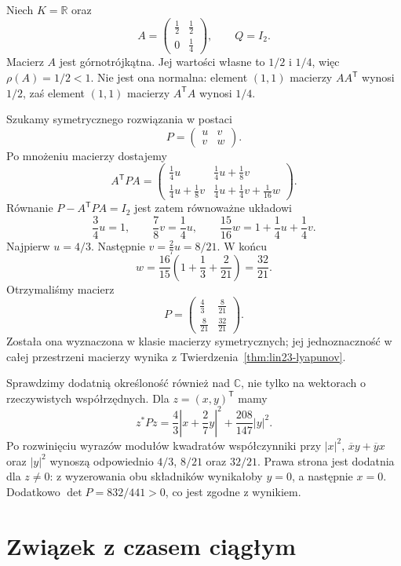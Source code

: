 \begin{przyklad}
\label{prz:lin23-nonnormal}
Niech \(K=\mathbb R\)
oraz
\[
 A=\begin{pmatrix}
 \frac12&\frac12\\
 0&\frac14
 \end{pmatrix},\qquad Q=I_2.
\]
Macierz \(A\) jest górnotrójkątna.
Jej wartości własne to
\(1/2\) i \(1/4\),
więc \(\rho(A)=1/2<1\).
Nie jest ona normalna:
element \((1,1)\) macierzy
\(AA^{\mathsf T}\)
wynosi \(1/2\), zaś
element \((1,1)\)
macierzy \(A^{\mathsf T}A\)
wynosi \(1/4\).

Szukamy symetrycznego
rozwiązania w postaci
\[
 P=\begin{pmatrix}u&v\\v&w\end{pmatrix}.
\]
Po mnożeniu macierzy dostajemy
\[
 A^{\mathsf T}PA
 =\begin{pmatrix}
 \frac14u&
 \frac14u+\frac18v\\
 \frac14u+\frac18v&
 \frac14u+\frac14v+\frac1{16}w
 \end{pmatrix}.
\]
Równanie \(P-A^{\mathsf T}PA=I_2\)
jest zatem równoważne układowi
\[
 \frac34u=1,\qquad
 \frac78v=\frac14u,\qquad
 \frac{15}{16}w
 =1+\frac14u+\frac14v.
\]
Najpierw \(u=4/3\).
Następnie
\(v=\frac27u=8/21\).
W końcu
\[
 w=\frac{16}{15}
       \left(1+\frac13+\frac2{21}\right)
   =\frac{32}{21}.
\]
Otrzymaliśmy macierz
\[
 P=\begin{pmatrix}
 \frac43&\frac8{21}\\
 \frac8{21}&\frac{32}{21}
 \end{pmatrix}.
\]
Została ona wyznaczona
w klasie macierzy symetrycznych;
jej jednoznaczność w całej
przestrzeni macierzy wynika
z Twierdzenia~\ref{thm:lin23-lyapunov}.

Sprawdzimy dodatnią określoność
również nad \(\mathbb C\),
nie tylko na wektorach
o rzeczywistych współrzędnych.
Dla \(z=(x,y)^{\mathsf T}\)
mamy
\[
 z^*Pz
 =\frac43\left|x+\frac27y\right|^2
  +\frac{208}{147}|y|^2.
\]
Po rozwinięciu wyrazów
modułów kwadratów
współczynniki przy
\(|x|^2\),
\(\overline{x}y+\overline{y}x\)
oraz \(|y|^2\) wynoszą
odpowiednio
\(4/3\), \(8/21\)
oraz \(32/21\).
Prawa strona jest dodatnia
dla \(z\ne0\):
z wyzerowania obu składników
wynikałoby \(y=0\),
a następnie \(x=0\).
Dodatkowo
\(\det P=832/441>0\),
co jest zgodne z wynikiem.
\end{przyklad}

\section{Związek z czasem ciągłym}
\label{sec:lin23-continuous}

